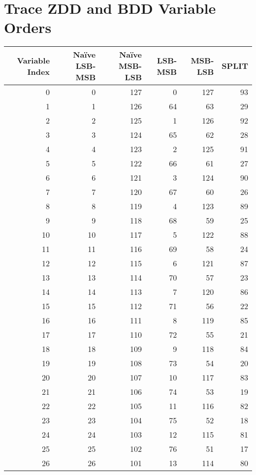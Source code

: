 \chapter{Trace ZDD and BDD Variable Orders}
\label{appendix:varorders}
\footnotesize
\centering
    \begin{longtable}{|r|r|r|r|r|r|}
      \hline
      Variable Index & Na\"{i}ve LSB-MSB & Na\"{i}ve MSB-LSB & LSB-MSB & MSB-LSB & SPLIT\\
      \hline
      0&0&127&0&127&93\\
      \hline
      1&1&126&64&63&29\\
      \hline
      2&2&125&1&126&92\\
      \hline
      3&3&124&65&62&28\\
      \hline
      4&4&123&2&125&91\\
      \hline
      5&5&122&66&61&27\\
      \hline
      6&6&121&3&124&90\\
      \hline
      7&7&120&67&60&26\\
      \hline
      8&8&119&4&123&89\\
      \hline
      9&9&118&68&59&25\\
      \hline
      10&10&117&5&122&88\\
      \hline
      11&11&116&69&58&24\\
      \hline
      12&12&115&6&121&87\\
      \hline
      13&13&114&70&57&23\\
      \hline
      14&14&113&7&120&86\\
      \hline
      15&15&112&71&56&22\\
      \hline
      16&16&111&8&119&85\\
      \hline
      17&17&110&72&55&21\\
      \hline
      18&18&109&9&118&84\\
      \hline
      19&19&108&73&54&20\\
      \hline
      20&20&107&10&117&83\\
      \hline
      21&21&106&74&53&19\\
      \hline 
      22&22&105&11&116&82\\
      \hline  
      23&23&104&75&52&18\\
      \hline 
      24&24&103&12&115&81\\
      \hline 
      25&25&102&76&51&17\\
      \hline 
      26&26&101&13&114&80\\

\end{longtable}
